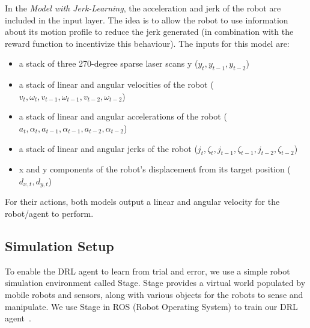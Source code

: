 In the \textit{Model with Jerk-Learning}, the acceleration and jerk of the robot are included in the input layer. The idea is to allow the robot to use information about its motion profile to reduce the jerk generated (in combination with the reward function to incentivize this behaviour). The inputs for this model are:
\begin{itemize}
\item a stack of three 270-degree sparse laser scans y ($y_{t}, y_{t-1}, y_{t-2}$)
\item a stack of linear and angular velocities of the robot ($v_{t}, \omega_{t}, v_{t-1}, \omega_{t-1}, v_{t-2}, \omega_{t-2}$)
\item a stack of linear and angular accelerations of the robot ($a_{t}, \alpha_{t}, a_{t-1}, \alpha_{t-1}, a_{t-2}, \alpha_{t-2}$)
\item a stack of linear and angular jerks of the robot ($j_{t}, \zeta_{t}, j_{t-1}, \zeta_{t-1}, j_{t-2}, \zeta_{t-2}$)
\item x and y components of the robot's displacement from its target position ($d_{x,t}, d_{y,t}$)
\end{itemize}

For their actions, both models output a linear and angular velocity for the robot/agent to perform.

\subsection{Simulation Setup}
To enable the DRL agent to learn from trial and error, we use a simple robot simulation environment called Stage. Stage provides a virtual world populated by mobile robots and sensors, along with various objects for the robots to sense and manipulate. We use Stage in ROS (Robot Operating System) to train our DRL agent~\cite{gerkey_playerstage_nodate}.

